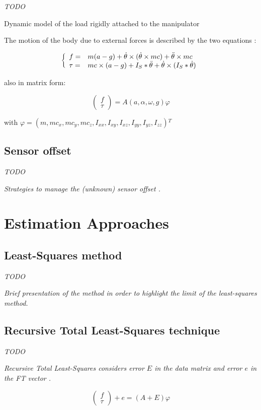 \documentclass[/home/francois/latex/report/main.tex]{subfiles}
\begin{document}
\textit{TODO}

Dynamic model of the load rigidly attached to the manipulator

The motion of the body due to external forces is described by the two equations \cite{Kubus2007, Kubus2008}:

\begin{equation}
 \label{dim_1}
 \left \{
 \begin{array}{l l}
  f =    & m (a - g) + \dot{\theta} \times (\dot{\theta} \times m c) + \ddot{\theta} \times m c \\
  \tau = & m c \times (a - g)
  + I_{S} \ast \ddot{\theta} + \dot{\theta} \times (I_{S} \ast \dot{\theta})
 \end{array}
 \right.
\end{equation}

also in matrix form:

\begin{equation}
 \begin{pmatrix}
  f    \\
  \tau
 \end{pmatrix}
 = A(a, \alpha, \omega, g) \varphi
\end{equation}

with $\varphi = (m, m c_x, m c_y, m c_z, I_{xx}, I_{xy}, I_{xz}, I_{yy}, I_{yz}, I_{zz}) {}^T$

\subsection{Sensor offset}

\textit{TODO}

{\it
Strategies to manage the (unknown) sensor offset \cite{Kubus2007, Kubus2008}.
}

\section{Estimation Approaches}

\subsection{Least-Squares method}

\textit{TODO}

{\it
Brief presentation of the method in order to highlight the limit of the least-squares method.
}

\subsection{Recursive Total Least-Squares technique}

\textit{TODO}

{\it
Recursive Total Least-Squares considers error $E$ in the data matrix and error $e$ in the \ac{FT} vector \cite{Kubus2008}
.

\begin{equation}
 \begin{pmatrix}
  f    \\
  \tau
 \end{pmatrix} + e
 = (A + E) \varphi
\end{equation}
}
\end{document}

